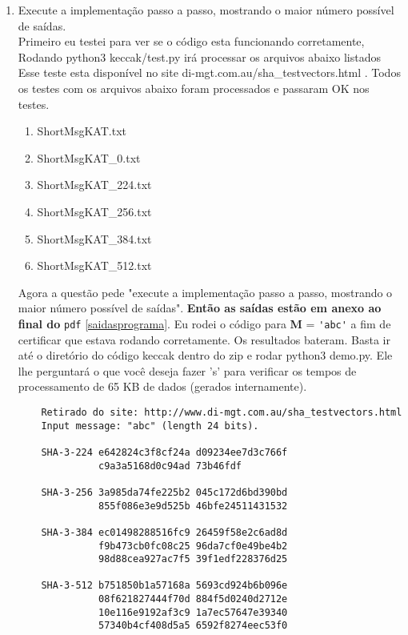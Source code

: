 \documentclass[12pt, a4paper]{article}
\begin{document}
\begin{enumerate}
\begin{enumerate}
\item Execute a implementação passo a passo, mostrando o maior número possível
de saídas.\\

Primeiro eu testei para ver se o código esta funcionando corretamente, Rodando
python3 keccak/test.py irá processar os arquivos abaixo listados Esse teste esta
disponível no site di-mgt.com.au/sha\_testvectors.html \cite{testskat}. Todos os
testes com os arquivos abaixo foram processados e passaram OK nos testes.\\

  \begin{enumerate}
    \item ShortMsgKAT.txt
    \item ShortMsgKAT\_0.txt
    \item ShortMsgKAT\_224.txt
    \item ShortMsgKAT\_256.txt
    \item ShortMsgKAT\_384.txt
    \item ShortMsgKAT\_512.txt
  \end{enumerate}

Agora a questão pede "execute a implementação passo a passo, mostrando o maior
número possível de saídas". {\bfseries Então as saídas estão em anexo ao final
do} \verb|pdf| \ref{saidasprograma}. Eu rodei o código para \textbf{M} =
{\color{Red} \verb|'abc'|} a fim de certificar que estava rodando corretamente.
Os resultados bateram. Basta ir até o diretório do código keccak dentro do zip e
rodar python3 demo.py. Ele lhe perguntará o que você deseja fazer 's' para
verificar os tempos de processamento de 65 KB de dados (gerados internamente).

  \begin{verbatim}
    Retirado do site: http://www.di-mgt.com.au/sha_testvectors.html
    Input message: "abc" (length 24 bits).

    SHA-3-224 e642824c3f8cf24a d09234ee7d3c766f
              c9a3a5168d0c94ad 73b46fdf

    SHA-3-256 3a985da74fe225b2 045c172d6bd390bd
              855f086e3e9d525b 46bfe24511431532

    SHA-3-384 ec01498288516fc9 26459f58e2c6ad8d
              f9b473cb0fc08c25 96da7cf0e49be4b2
              98d88cea927ac7f5 39f1edf228376d25

    SHA-3-512 b751850b1a57168a 5693cd924b6b096e
              08f621827444f70d 884f5d0240d2712e
              10e116e9192af3c9 1a7ec57647e39340
              57340b4cf408d5a5 6592f8274eec53f0
  \end{verbatim}


\end{enumerate}
\end{enumerate}
\end{document}

